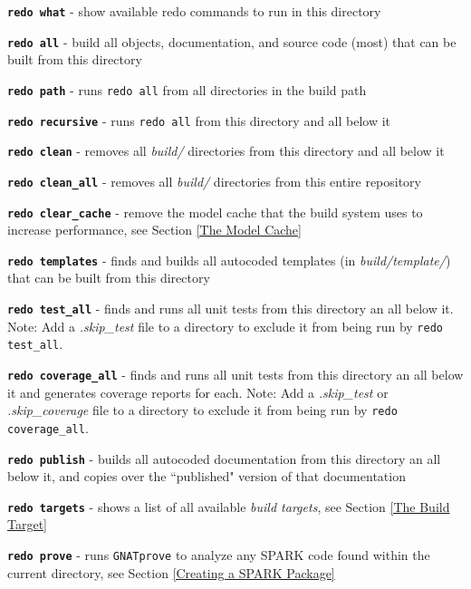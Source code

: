 \vspace{5mm} %
\begin{spaceditemize}
  \item \textbf{\texttt{redo what}} - show available redo commands to run in this directory
  \item \textbf{\texttt{redo all}} - build all objects, documentation, and source code (most) that can be built from this directory
  \item \textbf{\texttt{redo path}} - runs \texttt{redo all} from all directories in the build path
  \item \textbf{\texttt{redo recursive}} - runs \texttt{redo all} from this directory and all below it
  \item \textbf{\texttt{redo clean}} - removes all \textit{build/} directories from this directory and all below it
  \item \textbf{\texttt{redo clean\_all}} - removes all \textit{build/} directories from this entire repository
  \item \textbf{\texttt{redo clear\_cache}} - remove the model cache that the build system uses to increase performance, see Section \ref{The Model Cache}
  \item \textbf{\texttt{redo templates}} - finds and builds all autocoded templates (in \textit{build/template/}) that can be built from this directory
  \item \textbf{\texttt{redo test\_all}} - finds and runs all unit tests from this directory an all below it. Note: Add a \textit{.skip\_test} file to a directory to exclude it from being run by \texttt{redo test\_all}.
  \item \textbf{\texttt{redo coverage\_all}} - finds and runs all unit tests from this directory an all below it and generates coverage reports for each. Note: Add a \textit{.skip\_test} or \textit{.skip\_coverage} file to a directory to exclude it from being run by \texttt{redo coverage\_all}.
  \item \textbf{\texttt{redo publish}} - builds all autocoded documentation from this directory an all below it, and copies over the ``published" version of that documentation
  \item \textbf{\texttt{redo targets}} - shows a list of all available \textit{build targets}, see Section \ref{The Build Target}
  \item \textbf{\texttt{redo prove}} - runs \texttt{GNATprove} to analyze any SPARK code found within the current directory, see Section \ref{Creating a SPARK Package}

\end{spaceditemize}
